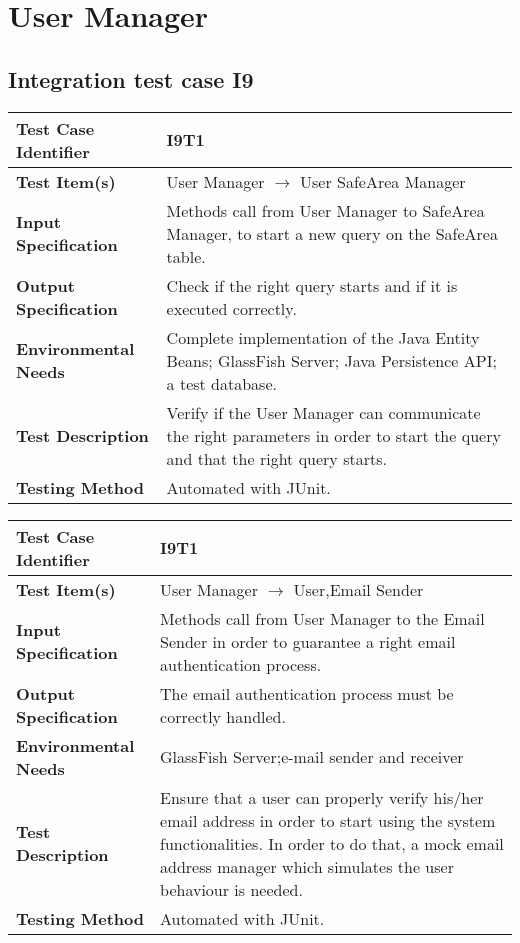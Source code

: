 \section{User Manager}
\subsection{Integration test case I9}

\begin{tabular}{l p{}}
    \hline
    \textbf{Test Case Identifier} & I9T1\\
    \hline
    \textbf{Test Item(s)} & User Manager $\rightarrow$ User SafeArea Manager\\
    \hline
    \textbf{Input Specification} & Methods call from User Manager to SafeArea Manager, to start a new query on the SafeArea table.\\
    \hline
    \textbf{Output Specification} & Check if the right query starts and if it is executed correctly.\\
    \hline
    \textbf{Environmental Needs} & Complete implementation of the Java Entity Beans; GlassFish Server; Java Persistence API; a test database.\\
    \hline
    \textbf{Test Description} & Verify if the User Manager can communicate the right parameters in order to start the query and that the right query starts.\\
    \hline
    \textbf{Testing Method} & Automated with JUnit.\\
    \hline
\end{tabular}

\begin{tabular}{l p{}}
    \hline
    \textbf{Test Case Identifier} & I9T1\\
    \hline
    \textbf{Test Item(s)} & User Manager $\rightarrow$ User,Email Sender \\
    \hline
    \textbf{Input Specification} & Methods call from User Manager to the Email Sender in order to guarantee a right email authentication process.\\
    \hline
    \textbf{Output Specification} & The email authentication process must be correctly handled.\\
    \hline
    \textbf{Environmental Needs} & GlassFish Server;e-mail sender and receiver\\
    \hline
    \textbf{Test Description} & Ensure that a user can properly verify his/her email address in order to start using the system functionalities. In order to do that, a mock email address manager which simulates the user behaviour is needed.\\
    \hline
    \textbf{Testing Method} & Automated with JUnit.\\
    \hline
\end{tabular}